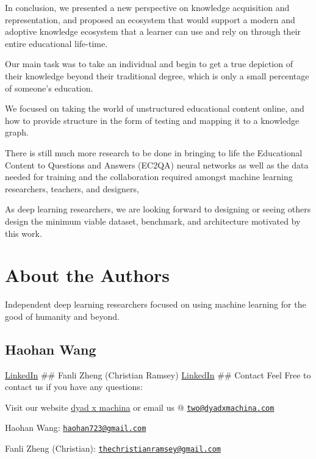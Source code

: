\documentclass{acm_proc_article-sp}
\begin{document}
In conclusion, we presented a new perspective on knowledge acquisition
and representation, and proposed an ecosystem that would support a
modern and adoptive knowledge ecosystem that a learner can use and rely
on through their entire educational life-time.

Our main task was to take an individual and begin to get a true
depiction of their knowledge beyond their traditional degree, which is
only a small percentage of someone's education.

We focused on taking the world of unstructured educational content
online, and how to provide structure in the form of testing and mapping
it to a knowledge graph.

There is still much more research to be done in bringing to life the
Educational Content to Questions and Answers (EC2QA) neural networks as
well as the data needed for training and the collaboration required
amongst machine learning researchers, teachers, and designers,

As deep learning researchers, we are looking forward to designing or
seeing others design the minimum viable dataset, benchmark, and
architecture motivated by this work.

\section{About the Authors}\label{about-the-authors}

Independent deep learning researchers focused on using machine learning
for the good of humanity and beyond.

\subsection{Haohan Wang}\label{haohan-wang}

\href{https://www.linkedin.com/in/haohanw}{LinkedIn} \#\# Fanli Zheng
(Christian Ramsey)
\href{https://www.linkedin.com/in/christianramsey/}{LinkedIn} \#\#
Contact Feel Free to contact us if you have any questions:

Visit our website \href{dyadxmachina.com}{dyad x machina} or email us @
\href{mailto:two@dyadxmachina.com}{\nolinkurl{two@dyadxmachina.com}}

Haohan Wang:
\href{mailto:haohan723@gmail.com}{\nolinkurl{haohan723@gmail.com}}

Fanli Zheng (Christian):
\href{mailto:thechristianramsey@gmail.com}{\nolinkurl{thechristianramsey@gmail.com}}
\setlength{\parindent}{0in}
\end{document}
